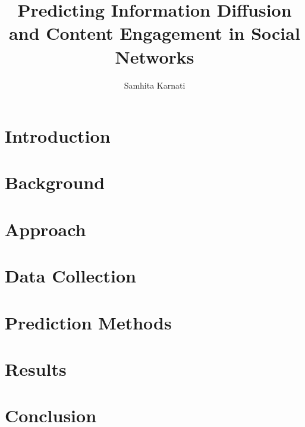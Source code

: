 \documentclass[12pt,lot,lof]{puthesis_undergraduate}
\title{Predicting Information Diffusion and Content Engagement in Social Networks}
\author{Samhita Karnati}
\begin{document}
\chapter{Introduction}\label{ch:intro}  %

\chapter{Background}


\chapter{Approach}


\chapter{Data Collection}


\chapter{Prediction Methods}


\chapter{Results}


\chapter{Conclusion}






\appendix


 \label{bib}
\end{document}
